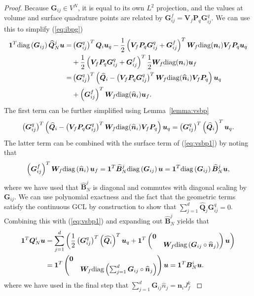 \documentclass[review]{siamart0216}
\theoremstyle{assumption}
\renewcommand{\hat}[1]{\hat{#1}}
\newcommand{\LRp}[1]{\left( #1 \right)}
\renewcommand{\hat}{\widehat}
\newcommand{\diag}[1]{{\rm diag}\LRp{#1}}
\begin{document}
\begin{proof}
Because $\bm{G}_{ij} \in V^N$, it is equal to its own $L^2$ projection, and the values at volume and surface quadrature points are related by $\bm{G}^f_{ij} = \bm{V}_f\bm{P}_q\bm{G}^q_{ij}$.  We can use this to simplify (\ref{eq:ibpg})
\begin{align*}
\bm{1}^T \diag{\bm{G}_{ij}} \hat{\bm{Q}}^j_N \bm{u} =&  \LRp{\bm{G}^q_{ij}}^T { \bm{Q}_i}  \bm{u}_q - \frac{1}{2} \LRp{{\bm{V}_f \bm{P}_q}\bm{G}_{ij}^q+\bm{G}^f_{ij}}^T{\bm{W}_f{\rm diag}({\bm{n}}_i)\bm{V}_f\bm{P}_q}\bm{u}_q\\
&+ \frac{1}{2} \LRp{{\bm{V}_f \bm{P}_q}\bm{G}_{ij}^q+\bm{G}^f_{ij}}^T\frac{1}{2}\bm{W}_f{\rm diag}({\bm{n}}_i)\bm{u}_f\\
=& \LRp{\bm{G}^q_{ij}}^T \LRp{ \hat{\bm{Q}}_i - \LRp{{\bm{V}_f \bm{P}_q}\bm{G}_{ij}^q}^T{\bm{W}_f{\rm diag}(\hat{\bm{n}}_i)\bm{V}_f\bm{P}_q}}\bm{u}_q \\
&+ \LRp{\bm{G}^f_{ij}}^T\bm{W}_f{\rm diag}(\hat{\bm{n}}_i)\bm{u}_f. %
\end{align*}
The first term can be further simplified using Lemma~\ref{lemma:vsbp}
\[
\LRp{\bm{G}^q_{ij}}^T \LRp{ \hat{\bm{Q}}_i - \LRp{{\bm{V}_f \bm{P}_q}\bm{G}_{ij}^q}^T{\bm{W}_f{\rm diag}(\hat{\bm{n}}_i)\bm{V}_f\bm{P}_q}}\bm{u}_q = \LRp{\bm{G}^q_{ij}}^T \LRp{ \hat{\bm{Q}}_i}^T\bm{u}_q.
\]
The latter term can be combined with the surface term of (\ref{eq:vsbp1}) by noting that 
\[
\LRp{\bm{G}^f_{ij}}^T\bm{W}_f \diag{\hat{\bm{n}}_i}\bm{u}_f =\bm{1}^T\hat{\bm{B}}^j_N\diag{\bm{G}_{ij}}\bm{u} = \bm{1}^T\diag{\bm{G}_{ij}}\hat{\bm{B}}^j_N\bm{u},
\]
where we have used that $\hat{\bm{B}}^j_N$ is diagonal and commutes with diagonal scaling by $\bm{G}_{ij}$.
We can use polynomial exactness and the fact that the geometric terms satisfy the continuous GCL by construction \cite{chan2018discretely} to show that $\sum_{j=1}^d  \hat{\bm{Q}}_j {\bm{G}^q_{ij}} = 0$.
Combining this with (\ref{eq:vsbp1}) and expanding out $\hat{\bm{B}}^j_N$ yields that
\begin{align*}
\bm{1}^T\bm{Q}^i_N\bm{u} &= \sum_{j=1}^d \LRp{
\frac{1}{2}\LRp{\bm{G}^q_{ij}}^T \LRp{ \hat{\bm{Q}_i}}^T \bm{u}_q + \bm{1}^T\begin{pmatrix}
\bm{0} &\\
& \bm{W}_f \diag{\bm{G}_{ij} \circ \hat{\bm{n}}_j}
\end{pmatrix}
\bm{u}} \\
&=  \bm{1}^T\begin{pmatrix}
\bm{0} &\\
& \bm{W}_f \diag{\sum_{j=1}^d \bm{G}_{ij} \circ \hat{\bm{n}}_j}
\end{pmatrix}
\bm{u} = \bm{1}^T\bm{B}^i_N\bm{u}.
\end{align*}
where we have used in the final step that $\sum_{j=1}^d\bm{G}_{ij}\hat{n}_j = \bm{n}_i J^k_f$ \cite{ciarlet1978finite, chan2018discretely}
\end{proof}
\end{document}
